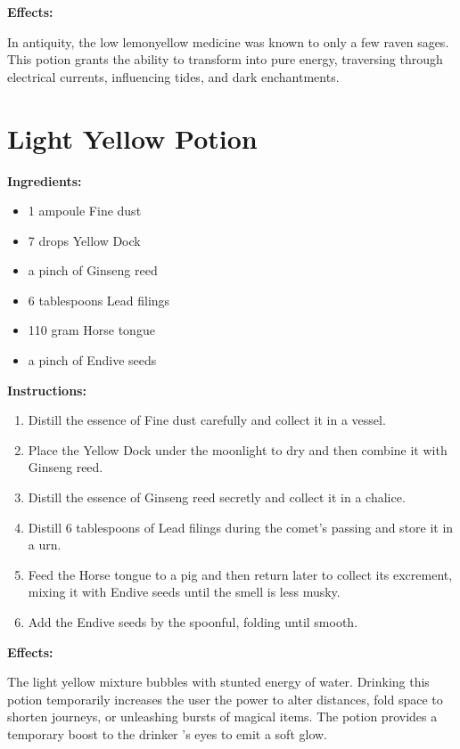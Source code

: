 \documentclass{article}
\begin{document}
\textbf{Effects:}

In antiquity, the low lemonyellow medicine was known to only a few raven sages. This potion grants the ability to transform into pure energy, traversing through electrical currents, influencing tides, and dark enchantments.

\newpage
\section*{Light Yellow Potion}

\textbf{Ingredients:}

\begin{itemize}
  \item 1 ampoule Fine dust
  \item 7 drops Yellow Dock
  \item a pinch of Ginseng reed
  \item 6 tablespoons Lead filings
  \item 110 gram Horse tongue
  \item a pinch of Endive seeds
\end{itemize}

\textbf{Instructions:}

\begin{enumerate}
  \item Distill the essence of Fine dust carefully and collect it in a vessel.
  \item Place the Yellow Dock under the moonlight to dry and then combine it with Ginseng reed.
  \item Distill the essence of Ginseng reed secretly and collect it in a chalice.
  \item Distill 6 tablespoons of Lead filings during the comet’s passing and store it in a urn.
  \item Feed the Horse tongue to a pig and then return later to collect its excrement, mixing it with Endive seeds until the smell is less musky.
  \item Add the Endive seeds by the spoonful, folding until smooth.
\end{enumerate}

\textbf{Effects:}

The light yellow mixture bubbles with stunted energy of water. Drinking this potion temporarily increases the user the power to alter distances, fold space to shorten journeys, or unleashing bursts of magical items. The potion provides a temporary boost to the drinker 's eyes to emit a soft glow.
\end{document}
